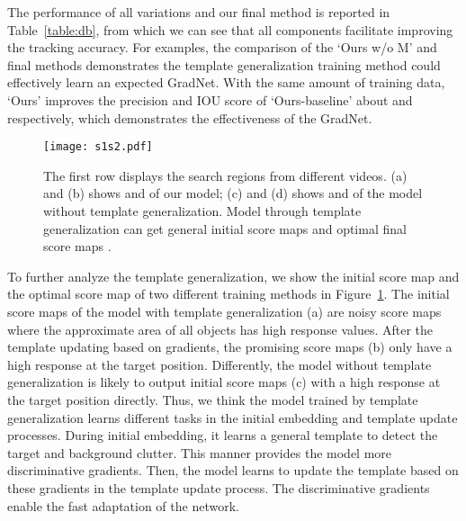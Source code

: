 \documentclass[10pt,twocolumn,letterpaper]{article}
\begin{document}
The performance of all variations and our final method is reported in Table~\ref{table:db},  from which we can see that all components facilitate improving the tracking accuracy. For examples, the comparison of the `Ours w/o M' and final methods demonstrates the template generalization training method could effectively learn an expected GradNet.
With the same amount of training data,  `Ours' improves the precision and IOU score of `Ours-baseline' about  and  respectively, which demonstrates the effectiveness of the GradNet.

\begin{figure}[t]
\centering
	\texttt{[image: s1s2.pdf]}\\
	\caption{The first row displays the search regions from different videos. (a) and (b) shows  and  of our model; (c) and (d) shows   and  of the model without template generalization. Model through template generalization can get general initial score maps  and optimal final score maps .} \label{fig:s1s2}
\end{figure}
{}
To further analyze the template generalization, we show the initial score map  and the optimal score map  of two different training methods in Figure~\ref{fig:s1s2}.
The initial score maps of the model with template generalization (a) are noisy score maps where the approximate area of all objects has high response values.
After the template updating based on gradients, the promising score maps (b) only have a high response at the target position.
Differently, the model without template generalization is likely to output initial score maps (c) with a high response at the target position directly.
Thus, we think the model trained by template generalization learns different tasks in the initial embedding and template update processes. During initial embedding, it learns a general template to detect the target and background clutter. This manner provides the model more discriminative gradients. Then, the model learns to update the template based on these gradients in the template update process.
The discriminative gradients enable the fast adaptation of the network.

















			
\end{document}
